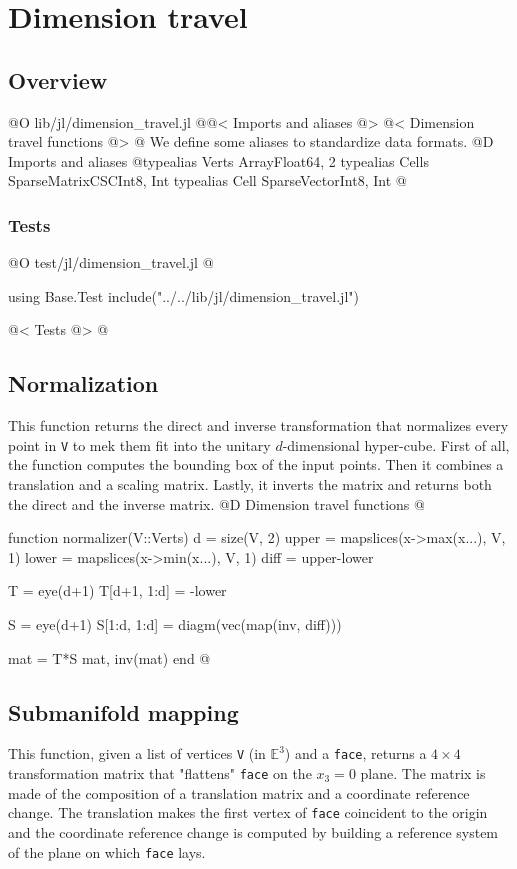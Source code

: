 
\chapter{Dimension travel}

\section{Overview}
@O lib/jl/dimension_travel.jl
@{@< Imports and aliases @>
@< Dimension travel functions @>
@}
We define some aliases to standardize data formats.
@D Imports and aliases
@{typealias Verts Array{Float64, 2}
typealias Cells SparseMatrixCSC{Int8, Int}
typealias Cell SparseVector{Int8, Int}
@}
\subsection{Tests}
@O test/jl/dimension_travel.jl
@{using Base.Test
include("../../lib/jl/dimension_travel.jl")

@< Tests @>
@}


\section{Normalization}
This function returns the direct and inverse transformation that
normalizes every point in \texttt{V} to mek them fit into the unitary
$d$-dimensional hyper-cube.
First of all, the function computes the bounding box of the input points.
Then it combines a translation and a scaling matrix. Lastly, it
inverts the matrix and returns both the direct and the inverse matrix.
@D Dimension travel functions
@{function normalizer(V::Verts)
    d = size(V, 2)
    upper = mapslices(x->max(x...), V, 1)
    lower = mapslices(x->min(x...), V, 1)
    diff = upper-lower

    T = eye(d+1)
    T[d+1, 1:d] = -lower

    S = eye(d+1)
    S[1:d, 1:d] = diagm(vec(map(inv, diff)))

    mat = T*S
    mat, inv(mat)
end
@}


\section{Submanifold mapping}

This function, given a list of vertices \texttt{V} (in $\mathbb{E}^3$) and a 
\texttt{face}, returns a $4\times4$ transformation matrix that "flattens"
\texttt{face} on the $x_3=0$ plane. The matrix is made of the composition of
a translation matrix and a coordinate reference change. The translation
makes the first vertex of \texttt{face} coincident to the origin and
the coordinate reference change is computed by building a reference
system of the plane on which \texttt{face} lays.

